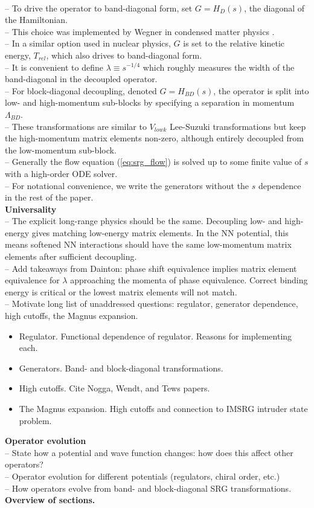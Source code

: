 \documentclass[preprintnumbers,floatfix,aps,prc,preprint,nofootinbib]{revtex4-1}
\begin{document}
\\
-- To drive the operator to band-diagonal form, set $G=H_D(s)$, the diagonal of the Hamiltonian.
\\
-- This choice was implemented by Wegner in condensed matter physics \cite{Wegner:1994ab}.
\\
-- In a similar option used in nuclear physics, $G$ is set to the relative kinetic energy, $T_{rel}$, which also drives to band-diagonal form.
\\
-- It is convenient to define $\lambda \equiv s^{-1/4}$ which roughly measures the width of the band-diagonal in the decoupled operator.
\\
-- For block-diagonal decoupling, denoted $G=H_{BD}(s)$, the operator is split into low- and high-momentum sub-blocks by specifying a separation in momentum $\Lambda_{BD}$.
\\
-- These transformations are similar to $V_{low k}$ Lee-Suzuki transformations but keep the high-momentum matrix elements non-zero, although entirely decoupled from the low-momentum sub-block.
\\
-- Generally the flow equation (\ref{eq:srg_flow}) is solved up to some finite value of $s$ with a high-order ODE solver.
\\
-- For notational convenience, we write the generators without the $s$ dependence in the rest of the paper.
\\
\textbf{Universality}
\\
-- The explicit long-range physics should be the same. Decoupling low- and high-energy gives matching low-energy matrix elements. In the NN potential, this means softened NN interactions should have the same low-momentum matrix elements after sufficient decoupling.
\\
-- Add takeaways from Dainton: phase shift equivalence implies matrix element equivalence for $\lambda$ approaching the momenta of phase equivalence. Correct binding energy is critical or the lowest matrix elements will not match.
\\
-- Motivate long list of unaddressed questions: regulator, generator dependence, high cutoffs, the Magnus expansion.
%
\begin{itemize}
	\item Regulator. Functional dependence of regulator. Reasons for implementing each.
	\item Generators. Band- and block-diagonal transformations.
	\item High cutoffs. Cite Nogga, Wendt, and Tews papers.
	\item The Magnus expansion. High cutoffs and connection to IMSRG intruder state problem.
\end{itemize}
%
\textbf{Operator evolution}
\\
-- State how a potential and wave function changes: how does this affect other operators?
\\
-- Operator evolution for different potentials (regulators, chiral order, etc.)
\\
-- How operators evolve from band- and block-diagonal SRG transformations.
\\
\textbf{Overview of sections.}
\end{document}
